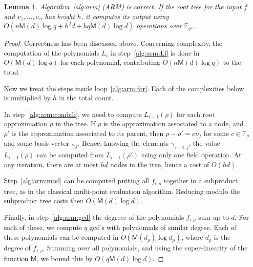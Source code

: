 \documentclass{sig-alternate}
\newcommand{\ff}[1]{\mathbb{F}_{#1}}
\newcommand{\dd}{d}
\newcommand{\qq}{q}
\newcommand{\nn}{n}
\newcommand{\qn}{{\qq^\nn}}
\newcommand{\basef}{\ff{\qq}}
\newcommand{\extf}{\ff{\qn}}
\newcommand{\Mul}{\mathsf{M}}
\newcounter{algo}
\newtheorem{Lem}{Lemma}
\begin{document}
 \begin{Lem}
 \label{complexity_arm}
   Algorithm~\ref{alg:arm} (ARM) is correct. If the root tree for the
   input $f$ and $\upsilon_1,\dots,\upsilon_\nn$ has height $h$, it
   computes its output using $O(\nn\Mul(\dd)\log\qq + h^2\dd +
   h\qq\Mul(\dd)\log\dd)$ operations over $\extf$.
 \end{Lem}
 \begin{proof}
   Correctness has been discussed above. Concerning complexity, the
   computation of the polynomials $L_i$ in step~\ref{alg:arm:Li} is
   done in $O(\Mul(\dd)\log\qq)$ for each polynomial, contributing
   $O(\nn\Mul(\dd)\log\qq)$ to the total.

   Now we treat the steps inside loop~\ref{alg:arm:for}.  Each of the
   complexities below is multiplied by $h$ in the total count.

   In step~\ref{alg:arm:combili}, we need to compute $L_{i-1}(\rho)$
   for each root approximation $\rho$ in the tree. If $\rho$ is the
   approximation associated to a node, and $\rho'$ is the
   approximation associated to its parent, then
   $\rho-\rho'=c\upsilon_j$ for some $c\in\basef$ and some basis
   vector $\upsilon_j$. Hence, knowing the elements $\gamma_{i-1,j}$,
   the value $L_{i-1}(\rho)$ can be computed from $L_{i-1}(\rho')$
   using only one field operation. At any iteration, there are at most
   $hd$ nodes in the tree, hence a cost of $O(hd)$.

   Step~\ref{alg:arm:mod} can be computed putting all $f_{i,\rho}$
   together in a subproduct tree, as in the classical multi-point
   evaluation algorithm. Reducing modulo the subproduct tree costs
   then $O(\Mul(\dd)\log\dd)$.

   Finally, in step~\ref{alg:arm:gcd} the degrees of the polynomials
   $f_{i,\rho}$ sum up to $\dd$. For each of these, we compute $\qq$
   gcd's with polynomials of similar degree. Each of these polynomials
   can be computed in $O(\Mul(\dd_\rho)\log\dd_\rho)$, where
   $\dd_\rho$ is the degree of $f_{i,\rho}$. Summing over all
   polynomials, and using the super-linearity of the function $\Mul$,
   we bound this by $O(\qq\Mul(d)\log d)$.
 \end{proof}
\end{document}
